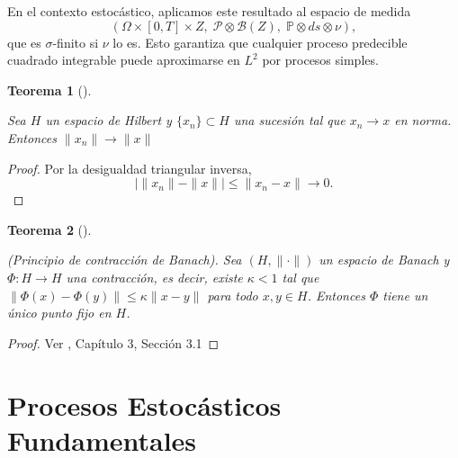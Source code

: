 \documentclass[
  spanish,
  us-letterpaper,
]{scrreprt}
\theoremstyle{plain}
\newtheorem{theorem}{Teorema}[chapter]
\theoremstyle{plain}
\theoremstyle{definition}
\theoremstyle{remark}
\begin{document}
En el contexto estocástico, aplicamos este resultado al espacio de
medida
\[(\Omega \times [0,T] \times Z, \; \mathcal{P} \otimes \mathcal{B}(Z), \; \mathbb{P} \otimes ds \otimes \nu),\]
que es \(\sigma\)-finito si \(\nu\) lo es. Esto garantiza que cualquier
proceso predecible cuadrado integrable puede aproximarse en \(L^2\) por
procesos simples.

\begin{theorem}[]\protect\hypertarget{thm-cont_norm_esp_Hil}{}\label{thm-cont_norm_esp_Hil}

Sea \(H\) un espacio de Hilbert y \(\{x_n\} \subset H\) una sucesión tal
que \(x_n \to x\) en norma. Entonces \(\|x_n\| \to \|x\|\)

\end{theorem}

\begin{proof}
Por la desigualdad triangular inversa,
\[\big| \|x_n\| - \|x\| \big| \leq \|x_n - x\| \to 0.\]
\end{proof}

\begin{theorem}[]\protect\hypertarget{thm-principio_contraccion_banach}{}\label{thm-principio_contraccion_banach}

(Principio de contracción de Banach). Sea \((H, \|\cdot\|)\) un espacio
de Banach y \(\Phi: H \to H\) una contracción, es decir, existe
\(\kappa < 1\) tal que \(\|\Phi(x) - \Phi(y)\| \leq \kappa \|x - y\|\)
para todo \(x, y \in H\). Entonces \(\Phi\) tiene un único punto fijo en
\(H\).

\end{theorem}

\begin{proof}
Ver \textcite{Istratescu2001a}, Capítulo 3, Sección 3.1
\end{proof}

\section{Procesos Estocásticos
Fundamentales}\label{procesos-estocuxe1sticos-fundamentales}
\end{document}
